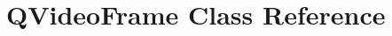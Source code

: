 \hypertarget{classGUI_1_1QtGui_1_1QVideoFrame}{}\section{Q\+Video\+Frame Class Reference}
\label{classGUI_1_1QtGui_1_1QVideoFrame}
